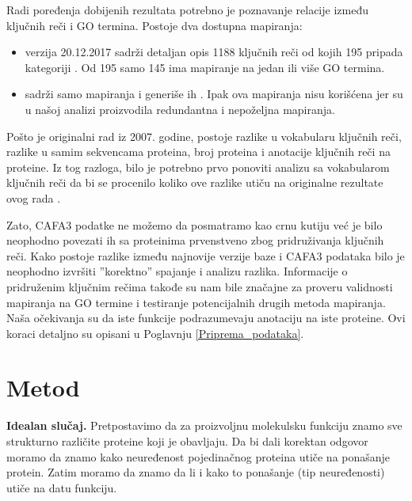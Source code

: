 Radi poređenja dobijenih rezultata potrebno je poznavanje relacije između
ključnih reči i GO termina. Postoje dva dostupna mapiranja:
\begin{itemize}
  \item \cite{keywlist_txt} verzija 20.12.2017 sadrži
    detaljan opis 1188 ključnih reči od kojih 195 pripada kategoriji
    .  Od 195 samo 145 ima mapiranje na jedan ili
    više GO termina.
  \item \cite{uniprotkb_kw2go} sadrži samo
    mapiranja i generiše ih  \parencite{Barrell2009}.
    Ipak ova mapiranja nisu korišćena jer su u našoj analizi proizvodila
    redundantna i nepoželjna mapiranja.
\end{itemize}

Pošto je originalni rad \parencite{Xie2007} iz 2007. godine, postoje razlike u
vokabularu ključnih reči, razlike u samim sekvencama proteina, broj proteina i
anotacije ključnih reči na proteine.  Iz tog razloga, bilo je potrebno
prvo ponoviti analizu sa vokabularom ključnih reči da bi se procenilo koliko
ove razlike utiču na originalne rezultate ovog rada \parencite{Xie2007}.

Zato, CAFA3 podatke ne možemo da posmatramo kao crnu kutiju već je
bilo neophodno povezati ih sa \swissprot proteinima prvenstveno zbog
pridruživanja ključnih reči. Kako postoje razlike između najnovije verzije \swissprot
baze i CAFA3 podataka bilo je neophodno izvršiti ''korektno'' spajanje i
analizu razlika.  Informacije o pridruženim ključnim rečima takođe su nam bile
značajne za proveru validnosti mapiranja na GO termine i testiranje
potencijalnih drugih metoda mapiranja. Naša očekivanja su da iste funkcije
podrazumevaju anotaciju na iste proteine.  Ovi koraci detaljno su opisani u
Poglavnju \ref{Priprema_podataka}.



\section {Metod}


\textbf{Idealan slučaj.} 
Pretpostavimo da za proizvoljnu molekulsku funkciju znamo sve strukturno različite
proteine koji je obavljaju.  Da bi dali korektan odgovor  moramo da znamo kako
neuređenost pojedinačnog proteina utiče na ponašanje protein.  Zatim moramo da
znamo da li i kako to ponašanje (tip neuređenosti) utiče na datu funkciju.


